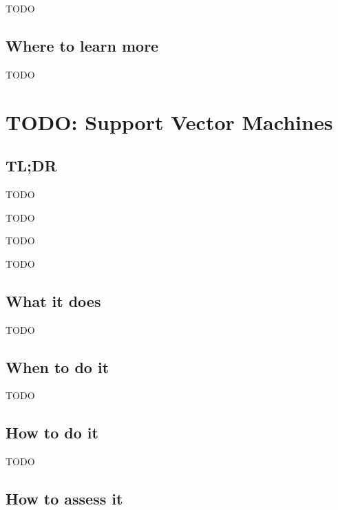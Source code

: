 \documentclass[
]{book}
\providecommand{\tightlist}{%
  \setlength{\itemsep}{0pt}\setlength{\parskip}{0pt}}
\begin{document}
TODO

\hypertarget{where-to-learn-more-19}{%
\section{Where to learn more}\label{where-to-learn-more-19}}

TODO

\hypertarget{support-vector-machines}{%
\chapter{TODO: Support Vector Machines}\label{support-vector-machines}}

\hypertarget{tldr-20}{%
\section{TL;DR}\label{tldr-20}}

\begin{description}
\tightlist
\item[What it does]
TODO
\item[When to do it]
TODO
\item[How to do it]
TODO
\item[How to assess it]
TODO
\end{description}

\hypertarget{what-it-does-20}{%
\section{What it does}\label{what-it-does-20}}

TODO

\hypertarget{when-to-do-it-20}{%
\section{When to do it}\label{when-to-do-it-20}}

TODO

\hypertarget{how-to-do-it-20}{%
\section{How to do it}\label{how-to-do-it-20}}

TODO

\hypertarget{how-to-assess-it-20}{%
\section{How to assess it}\label{how-to-assess-it-20}}
\end{document}
